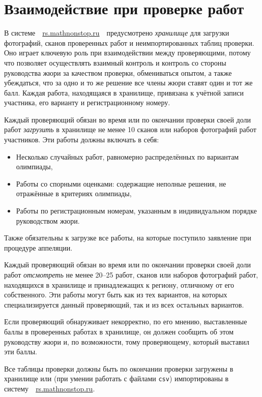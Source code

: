\documentclass[a4paper,12pt]{article}
\begin{document}
\section{Взаимодействие при проверке работ}

В системе\ \ \url{rs.mathnonstop.ru}\ \ предусмотрено {\it хранилище} для загрузки фотографий, сканов проверенных работ и неимпортированных таблиц проверки. Оно играет ключевую роль при взаимодействии между проверяющими, потому что позволяет осуществлять взаимный контроль и контроль со стороны руководства жюри за качеством проверки, обмениваться опытом, а также убеждаться, что за одно и то же решение все члены жюри ставят один и тот же балл. Каждая работа, находящаяся в хранилище, привязана к учётной записи участника, его варианту и регистрационному номеру.

Каждый проверяющий обязан во время или по окончании проверки своей доли работ {\it загрузить} в хранилище не менее 10 сканов или наборов фотографий работ участников. Эти работы должны включать в себя: \vspace{-4mm}

\begin{itemize}
	\item Несколько случайных работ, равномерно распределённых по вариантам олимпиады,
	\item Работы со спорными оценками: содержащие неполные решения, не отражённые в критериях олимпиады,
	\item Работы по регистрационным номерам, указанным в индивидуальном порядке руководством жюри.
\end{itemize}

Также обязательны к загрузке все работы, на которые поступило заявление при процедуре аппеляции.

Каждый проверяющий обязан во время или по окончании проверки своей доли работ {\it отсмотреть} не менее 20–25 работ, сканов или наборов фотографий работ, находящихся в хранилище и принадлежащих к региону, отличному от его собственного. Эти работы могут быть как из тех вариантов, на которых специализируется данный проверяющий, так и из всех остальных вариантов.

Если проверяющий обнаруживает некорректно, по его мнению, выставленные баллы в проверенных работах в хранилище, он должен сообщить об этом руководству жюри и, по возможности, тому проверяющему, который выставил эти баллы.

Все таблицы проверки должны быть по окончании проверки загружены в хранилище или (при умении работать с файлами {\tt csv}) импортированы в систему\ \ \url{rs.mathnonstop.ru}.
\end{document}
